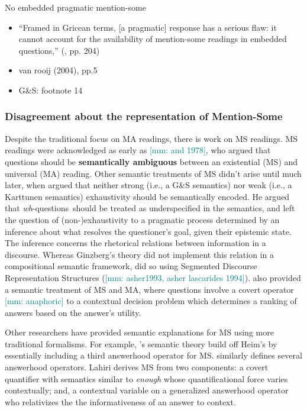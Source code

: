 \documentclass[12pt,letterpaper,table,svgnames,dvipsnames]{article}
\newcommand{\mm}[1]{\textcolor{teal}{[mm: #1]}}
\newcommand{\whqs}{\emph{wh}-questions~}
\begin{document}
\noindent No embedded pragmatic mention-some
\begin{itemize}
    \item ``Framed in Gricean terms, [a pragmatic] response has a serious flaw: it cannot account for the availability of mention-some readings in embedded questions,'' (\cite{george2011}, pp. 204)
    \item van rooij (2004), pp.5
    \item G\&S: footnote 14
\end{itemize}






\subsubsection{Disagreement about the representation of Mention-Some}
Despite the traditional focus on MA readings, there is work on MS readings. MS readings were acknowledged as early as  \mm{and 1978}, who argued that questions should be \textbf{semantically ambiguous} between an existential (MS) and universal (MA) reading. Other semantic treatments of MS didn't arise until much later, when  argued that neither strong (i.e., a G\&S semantics) nor weak (i.e., a Karttunen semantics) exhaustivity should be semantically encoded. He argued that \whqs should be treated as underspecified in the semantics, and left the question of (non-)exhaustivity to a pragmatic process determined by an inference about what resolves the questioner's goal, given their epistemic state. The inference concerns the rhetorical relations between information in a discourse. Whereas Ginzberg's theory did not implement this relation in a compositional semantic framework,  did so using Segmented Discourse Representation Structures (\mm{asher1993, asher lascarides 1994}).  also provided a semantic treatment of MS and MA, where questions involve a covert operator \mm{anaphoric} to a contextual decision problem which determines a ranking of answers based on the answer's utility. 

Other researchers have provided semantic explanations for MS using more traditional formalisms. For example, \cite{beckrull1999}'s semantic theory build off Heim's by essentially including a third answerhood operator for MS.  similarly defines several answerhood operators. Lahiri derives MS from two components: a covert quantifier with semantics similar to \emph{enough} whose quantificational force varies contextually; and, a contextual variable on a generalized answerhood operator who relativizes the the informativeness of an answer to context.
\end{document}
